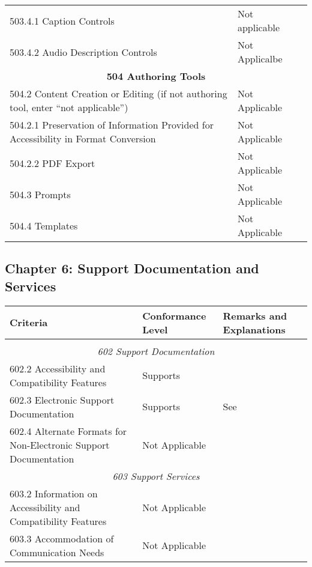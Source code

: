\documentclass{report}
\begin{document}
\begin{longtable}{p{}<{\RaggedRight}p{}<{\RaggedRight}p{}<{\RaggedRight}}
  503.4.1 Caption Controls & Not applicable\\
  503.4.2 Audio Description Controls & Not Applicalbe\\
  \multicolumn{3}{c}{\bfseries 504 Authoring Tools}\\
  504.2 Content Creation or Editing (if not authoring tool, enter
  ``not applicable'') & Not Applicable\\
  504.2.1 Preservation of Information Provided for Accessibility in
  Format Conversion & Not Applicable\\
  504.2.2 PDF Export & Not Applicable\\
  504.3 Prompts & Not Applicable\\
  504.4 Templates & Not Applicable\\
\end{longtable}

\subsection{Chapter 6: Support Documentation and Services}
\label{sec:508-6}

\begin{longtable}{p{}<{\RaggedRight}p{}<{\RaggedRight}p{}<{\RaggedRight}}
  \toprule
  Criteria & Conformance Level & Remarks and Explanations \\
  \midrule
  \endhead
  \bottomrule
  \endfoot
\multicolumn{3}{c}{\bfseries 601.1 Scope}\\
  \multicolumn{3}{c}{\itshape 602 Support Documentation}\\
  602.2 Accessibility and Compatibility Features & Supports\\
  602.3 Electronic Support Documentation & Supports & See
                                                      \nameref{sec:wcag} \\
  602.4 Alternate Formats for Non-Electronic Support Documentation &
                                                                     Not
                                                                     Applicable
  \\ 
  \multicolumn{3}{c}{\itshape 603 Support Services}\\
  603.2 Information on Accessibility and Compatibility Features & Not
                                                                  Applicable\\ 
  603.3 Accommodation of Communication Needs & Not Applicable\\
\end{longtable}
\end{document}
